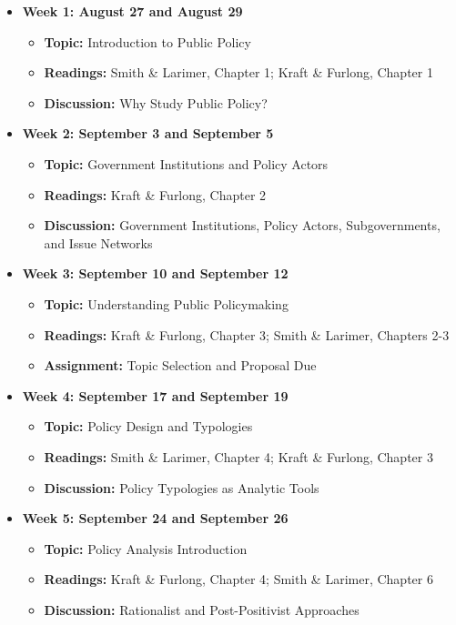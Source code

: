 \documentclass[12pt, letterpaper]{article}
\begin{document}
\begin{itemize}
    \item \textbf{Week 1: August 27 and August 29}
    \begin{itemize}
        \item \textbf{Topic:} Introduction to Public Policy
        \item \textbf{Readings:} Smith \& Larimer, Chapter 1; Kraft \& Furlong, Chapter 1
        \item \textbf{Discussion:} Why Study Public Policy?
    \end{itemize}

    \item \textbf{Week 2: September 3 and September 5}
    \begin{itemize}
        \item \textbf{Topic:} Government Institutions and Policy Actors
        \item \textbf{Readings:} Kraft \& Furlong, Chapter 2
        \item \textbf{Discussion:} Government Institutions, Policy Actors, Subgovernments, and Issue Networks

    \end{itemize}

    \item \textbf{Week 3: September 10 and September 12}
    \begin{itemize}
        \item \textbf{Topic:} Understanding Public Policymaking
        \item \textbf{Readings:} Kraft \& Furlong, Chapter 3; Smith \& Larimer, Chapters 2-3
        \item \textbf{Assignment:} Topic Selection and Proposal Due
    \end{itemize}

    \item \textbf{Week 4: September 17 and September 19}
    \begin{itemize}
        \item \textbf{Topic:} Policy Design and Typologies
        \item \textbf{Readings:} Smith \& Larimer, Chapter 4; Kraft \& Furlong, Chapter 3
        \item \textbf{Discussion:} Policy Typologies as Analytic Tools
    \end{itemize}

    \item \textbf{Week 5: September 24 and September 26}
    \begin{itemize}
        \item \textbf{Topic:} Policy Analysis Introduction
        \item \textbf{Readings:} Kraft \& Furlong, Chapter 4; Smith \& Larimer, Chapter 6
        \item \textbf{Discussion:} Rationalist and Post-Positivist Approaches
    \end{itemize}


\end{itemize}
\end{document}
